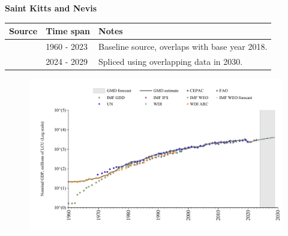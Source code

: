 \documentclass[12pt,a4paper,landscape]{article}
\begin{document}
\begin{adjustbox}{max totalsize={\paperwidth}{\paperheight},center}
\begin{minipage}[t][\textheight][t]{\textwidth}
\vspace*{0.5cm}
{}
\begin{center}
{\Large\bfseries Saint Kitts and Nevis}
\end{center}
\vspace{0.5cm}
\begin{table}[H]
\centering
\small
\begin{tabular}{|l|l|l|}
\hline
\textbf{Source} & \textbf{Time span} & \textbf{Notes} \\
\hline
\rowcolor{white}\cite{WDI}& 1960 - 2023 &Baseline source, overlaps with base year 2018.\\
\rowcolor{lightgray}\cite{IMF_WEO_forecast}& 2024 - 2029 &Spliced using overlapping data in 2030.\\
\hline
\end{tabular}
\end{table}
\begin{figure}[H]
\centering
\includegraphics[width=\textwidth,height=0.6\textheight,keepaspectratio]{graphs/KNA_nGDP.pdf}
\end{figure}
\end{minipage}
\end{adjustbox}
\end{document}
